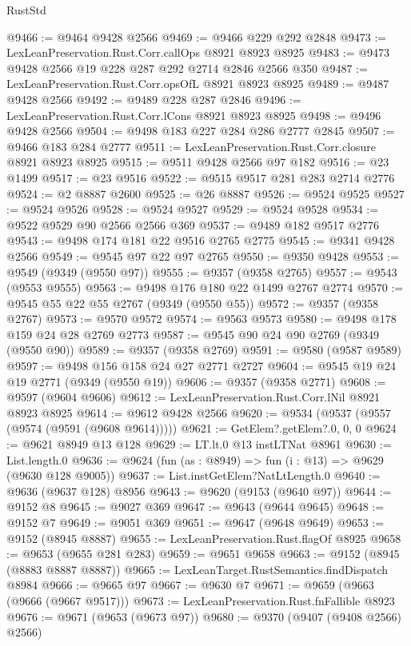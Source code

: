 \begin{lexlean}{RustStd}
\begin{coremodule}
@9466 := @9464 @9428 @2566
@9469 := @9466 @229 @292 @2848
@9473 := LexLeanPreservation.Rust.Corr.callOps @8921 @8923 @8925
@9483 := @9473 @9428 @2566 @19 @228 @287 @292 @2714 @2846 @2566 @350
@9487 := LexLeanPreservation.Rust.Corr.opsOfL @8921 @8923 @8925
@9489 := @9487 @9428 @2566
@9492 := @9489 @228 @287 @2846
@9496 := LexLeanPreservation.Rust.Corr.lCons @8921 @8923 @8925
@9498 := @9496 @9428 @2566
@9504 := @9498 @183 @227 @284 @286 @2777 @2845
@9507 := @9466 @183 @284 @2777
@9511 := LexLeanPreservation.Rust.Corr.closure @8921 @8923 @8925
@9515 := @9511 @9428 @2566 @97 @182
@9516 := @23 @1499
@9517 := @23 @9516
@9522 := @9515 @9517 @281 @283 @2714 @2776
@9524 := @2 @8887 @2600
@9525 := @26 @8887
@9526 := @9524 @9525
@9527 := @9524 @9526
@9528 := @9524 @9527
@9529 := @9524 @9528
@9534 := @9522 @9529 @90 @2566 @2566 @369
@9537 := @9489 @182 @9517 @2776
@9543 := @9498 @174 @181 @22 @9516 @2765 @2775
@9545 := @9341 @9428 @2566
@9549 := @9545 @97 @22 @97 @2765
@9550 := @9350 @9428
@9553 := @9549 (@9349 (@9550 @97))
@9555 := @9357 (@9358 @2765)
@9557 := @9543 (@9553 @9555)
@9563 := @9498 @176 @180 @22 @1499 @2767 @2774
@9570 := @9545 @55 @22 @55 @2767 (@9349 (@9550 @55))
@9572 := @9357 (@9358 @2767)
@9573 := @9570 @9572
@9574 := @9563 @9573
@9580 := @9498 @178 @159 @24 @28 @2769 @2773
@9587 := @9545 @90 @24 @90 @2769 (@9349 (@9550 @90))
@9589 := @9357 (@9358 @2769)
@9591 := @9580 (@9587 @9589)
@9597 := @9498 @156 @158 @24 @27 @2771 @2727
@9604 := @9545 @19 @24 @19 @2771 (@9349 (@9550 @19))
@9606 := @9357 (@9358 @2771)
@9608 := @9597 (@9604 @9606)
@9612 := LexLeanPreservation.Rust.Corr.lNil @8921 @8923 @8925
@9614 := @9612 @9428 @2566
@9620 := @9534 (@9537 (@9557 (@9574 (@9591 (@9608 @9614)))))
@9621 := GetElem?.getElem?.{0, 0, 0}
@9624 := @9621 @8949 @13 @128
@9629 := LT.lt.{0} @13 instLTNat @8961
@9630 := List.length.{0}
@9636 := @9624 (fun (as : @8949) => fun (i : @13) => @9629 (@9630 @128 @9005))
@9637 := List.instGetElem?NatLtLength.{0}
@9640 := @9636 (@9637 @128) @8956
@9643 := @9620 (@9153 (@9640 @97))
@9644 := @9152 @8
@9645 := @9027 @369
@9647 := @9643 (@9644 @9645)
@9648 := @9152 @7
@9649 := @9051 @369
@9651 := @9647 (@9648 @9649)
@9653 := @9152 (@8945 @8887)
@9655 := LexLeanPreservation.Rust.flagOf @8925
@9658 := @9653 (@9655 @281 @283)
@9659 := @9651 @9658
@9663 := @9152 (@8945 (@8883 @8887 @8887))
@9665 := LexLeanTarget.RustSemantics.findDispatch @8984
@9666 := @9665 @97
@9667 := @9630 @7
@9671 := @9659 (@9663 (@9666 (@9667 @9517)))
@9673 := LexLeanPreservation.Rust.fnFallible @8923
@9676 := @9671 (@9653 (@9673 @97))
@9680 := @9370 (@9407 (@9408 @2566) @2566)

\end{coremodule}
\end{lexlean}
